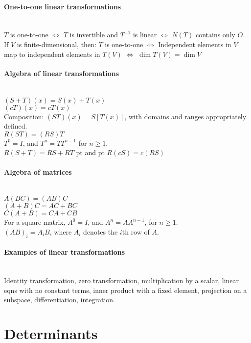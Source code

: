 \documentclass[10pt]{article}
\begin{document}
\paragraph{One-to-one linear transformations}\ \\
$T$ is one-to-one $\Longleftrightarrow$ $T$ is invertible and $T^{-1}$ is linear $\Longleftrightarrow$ $N(T)$ contains only $O$.\\
If $V$ is finite-dimensional, then: $T$ is one-to-one $\Longleftrightarrow$ Independent elements in $V$ map to
independent elements in $T(V)$ $\Longleftrightarrow$ $\dim T(V) = \dim V$

\paragraph{Algebra of linear transformations}\ \\
$(S+T)(x) = S(x) + T(x)$\\
$(cT)(x) = cT(x)$\\
Composition: $(ST)(x) = S[T(x)]$, with domains and ranges appropriately defined.\\
$R(ST) = (RS)T$\\
$T^0 = I$, and $T^n = TT^{n-1}$ for $n \geq 1$.\\
$R(S + T) = RS + RT$  pt and  pt $R(cS) = c(RS)$

\paragraph{Algebra of matrices}\ \\
$A(BC) = (AB)C$\\
$(A+B)C = AC + BC$\\
$C(A+B) = CA + CB$\\
For a square matrix, $A^0 = I$, and $A^n = AA^{n-1}$, for $n \geq 1$.\\
$(AB)_i = A_i B$, where $A_i$ denotes the $i$th row of $A$.

\paragraph{Examples of linear transformations}\ \\
Identity transformation, zero transformation, multiplication by a scalar, linear eqns with no constant terms,
inner product with a fixed element, projection on a subspace, differentiation, integration.



\bigskip\bigskip
\section{Determinants}\smallskip
\end{document}
